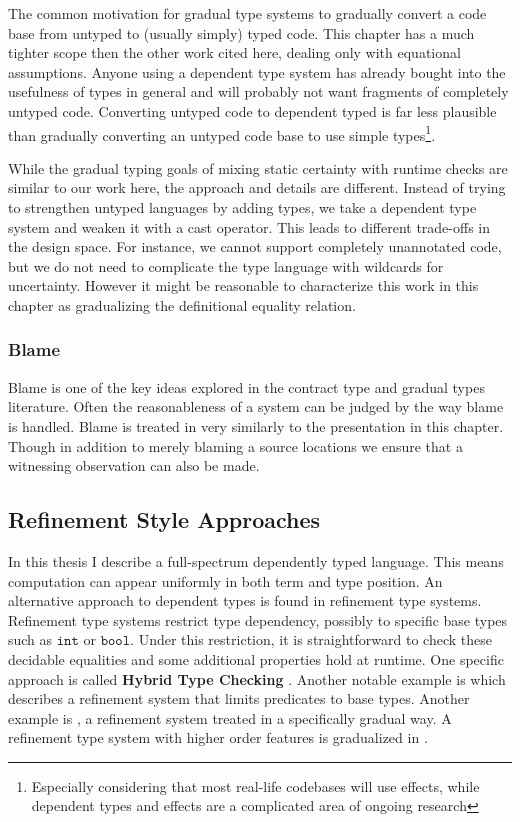The common motivation for gradual type systems to gradually convert
a code base from untyped to (usually simply) typed code. This chapter
has a much tighter scope then the other work cited here, dealing only
with equational assumptions. Anyone using a dependent type system
has already bought into the usefulness of types in general and will
probably not want fragments of completely untyped code. Converting
untyped code to dependent typed is far less plausible than gradually
converting an untyped code base to use simple types\footnote{Especially considering that most real-life codebases will use effects,
while dependent types and effects are a complicated area of ongoing
research}.

While the gradual typing goals of mixing static certainty with runtime
checks are similar to our work here, the approach and details are
different. Instead of trying to strengthen untyped languages by adding
types, we take a dependent type system and weaken it with a cast operator.
This leads to different trade-offs in the design space. For instance,
we cannot support completely unannotated code, but we do not need
to complicate the type language with wildcards for uncertainty. However
it might be reasonable to characterize this work in this chapter as
gradualizing the definitional equality relation.

\subsubsection{Blame}

Blame is one of the key ideas explored in the contract type and gradual
types literature\cite{10.1007/978-3-642-00590-9_1,wadler:LIPIcs:2015:5033,10.1145/3110283}.
Often the reasonableness of a system can be judged by the way blame
is handled\cite{wadler:LIPIcs:2015:5033}. Blame is treated in \cite{wadler:LIPIcs:2015:5033}
very similarly to the presentation in this chapter. Though in addition
to merely blaming a source locations we ensure that a witnessing observation
can also be made.

\subsection{Refinement Style Approaches}

In this thesis I describe a full-spectrum dependently typed language.
This means computation can appear uniformly in both term and type
position. An alternative approach to dependent types is found in refinement
type systems. Refinement type systems restrict type dependency, possibly
to specific base types such as $\mathtt{int}$ or $\mathtt{bool}$.
Under this restriction, it is straightforward to check these decidable
equalities and some additional properties hold at runtime. One specific
approach is called \textbf{Hybrid Type Checking} \cite{10.1145/1111037.1111059}.
Another notable example is \cite{10.1007/1-4020-8141-3_34} which
describes a refinement system that limits predicates to base types.
Another example is \cite{10.1145/3093333.3009856}, a refinement system
treated in a specifically gradual way. A refinement type system with
higher order features is gradualized in \cite{c4be73a0daf74c9aa4d13483a2c4dd0e}.

